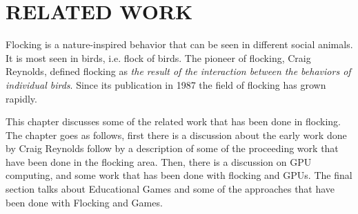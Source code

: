 \chapter{RELATED WORK}\label{chap2}


Flocking is a nature-inspired behavior that can be seen in different social animals. It is most seen in birds, i.e. flock of birds. The pioneer of flocking, Craig Reynolds, defined flocking as \textit{the result of the interaction between the behaviors of individual birds}\cite{craig1}. Since its publication in 1987 the field of flocking has grown rapidly. %

This chapter discusses some of the related work that has been done in flocking. The chapter goes as follows, first there is a discussion about the early work done by Craig Reynolds follow by a description of some of the proceeding work that have been done in the flocking area. Then, there is a discussion on GPU computing, and some work that has been done with flocking and GPUs. The final section talks about Educational Games and some of the approaches that have been done with Flocking and Games.






